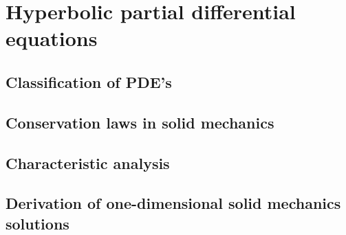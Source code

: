 \chapter{Hyperbolic partial differential equations}
\newpage
\section{Classification of PDE's}


\section{Conservation laws in solid mechanics}
%


\section{Characteristic analysis}
%


\section{Derivation of one-dimensional solid mechanics solutions}
%




